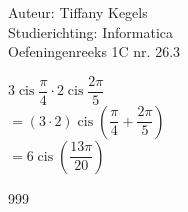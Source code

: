 \documentclass[a4paper]{article}
\begin{document}
  
\noindent \large Auteur: Tiffany Kegels \\
\noindent \large Studierichting: Informatica\\
\noindent \large Oefeningenreeks 1C nr. 26.3\\

\medskip

\normalsize

$3 \operatorname{cis} \dfrac{\pi}{4} \cdot 2 \operatorname{cis} \dfrac{2\pi}{5}$\\

$= (3 \cdot 2) \operatorname{cis} \left( \dfrac{\pi}{4} + \dfrac{2\pi}{5}\right)$\\

$= 6 \operatorname{cis} \left( \dfrac{13\pi}{20} \right)$


\begin{thebibliography}{999}

\end{thebibliography}
\end{document}
